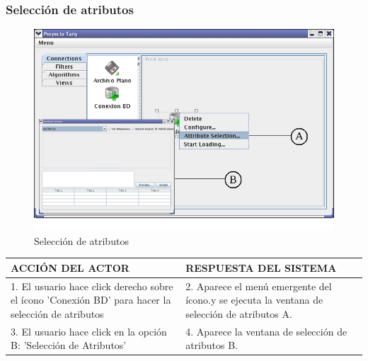 \subsubsection{Selecci\'on de atributos}
\begin{figure}[ht]
\centering
\includegraphics[width=1\textwidth]{images/09.png}
\caption{Selecci\'on de atributos}
\end{figure}
\begin{center}
\begin{tabular}{|p{60mm}|p{60mm}|} \hline
ACCI\'ON DEL ACTOR & RESPUESTA DEL SISTEMA \\ \hline
1. El usuario hace click derecho sobre el \'icono 'Conexi\'on BD' para hacer la selecci\'on de atributos  & 2. Aparece el men\'u emergente del \'icono.y se ejecuta la ventana de selecci\'on de atributos A. \\ \hline 3. El usuario hace click en la opci\'on B: 'Selecci\'on de Atributos' & 4. Aparece la ventana de selecci\'on de atributos B.  \\ \hline
\end{tabular}
\end{center}

\newpage
